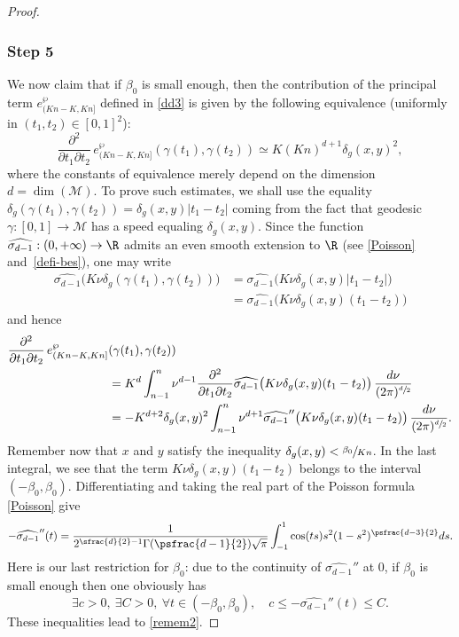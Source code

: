 \begin{proof}
\subsubsection*{Step 5}
We now claim that if $\beta_0$ is small enough, then the contribution of the principal term $e_{(Kn-K,Kn]}^\wp$ defined in \eqref{dd3} is given by the following equivalence (uniformly in $(t_1,t_2)\in [0,1]^2$):\vspace*{-3pt}
\begin{equation}\label{remem2}
\frac{\partial^2}{\partial t_1 \partial t_2}\, e_{(Kn-K,Kn]}^\wp(\gamma(t_1),\gamma(t_2)) \simeq K(Kn)^{d+1} \delta_g(x,y)^2 , \end{equation}
where the constants of equivalence merely depend on the dimension $d=\dim(\mathcal{M})$.
To prove such estimates, we shall use the equality $\delta_g(\gamma(t_1),\gamma(t_2))=\delta_g(x,y)|t_1-t_2|$ coming from the fact that geodesic $\gamma:[0,1]\to \mathcal{M}$ has a speed equaling $\delta_g(x,y)$.
Since the function $\widehat{\sigma_{d-1}}:(0,+\infty)\to \R$ admits an even smooth extension to $\R$ (see \eqref{Poisson} and~\eqref{defi-bes}), one may write
\begin{align*}
\widehat{\sigma_{d-1}}\bigl(K\nu\delta_g(\gamma(t_1),\gamma(t_2))\bigr)&=\widehat{\sigma_{d-1}}\bigl(K\nu \delta_g(x,y) |t_1-t_2|\bigr)\\
&= \widehat{\sigma_{d-1}}\bigl(K\nu \delta_g(x,y) (t_1-t_2)\bigr)
\end{align*}
and hence
\begin{align*}
\frac{\partial^2}{\partial t_1 \partial t_2}\, e_{(Kn-K,Kn]}^\wp&(\gamma(t_1),\gamma(t_2)) \\
&= K^d \int_{n-1}^{n} \nu^{d-1} \frac{\partial^2}{\partial t_1 \partial t_2}\widehat{\sigma_{d-1}}\bigl(K\nu \delta_g(x,y) (t_1-t_2)\bigr) \,\frac{d\nu}{(2\pi)^{\sfrac{d}{2}}}\\
&= -K^{d+2} \delta_g(x,y)^2\int_{n-1}^{n} \nu^{d+1} \widehat{\sigma_{d-1}}''\bigl(K\nu \delta_g(x,y) (t_1-t_2)\bigr) \,\frac{d\nu}{(2\pi)^{\sfrac{d}{2}}}.
\end{align*}
Remember now that $x$ and $y$ satisfy the inequality $\delta_g(x,y)<\sfrac{\beta_0}{Kn}$.
In the last integral, we see that the term $K\nu\delta_g(x,y)(t_1-t_2)$ belongs to the interval $(-\beta_0,\beta_0)$.
Differentiating and taking the real part of the Poisson formula \eqref{Poisson} give\vspace*{-3pt}
\begin{equation*}
-\widehat{\sigma_{d-1}}''(t)=\frac{1}{2^{\sfrac{d}{2}-1}\Gamma(\psfrac{d-1}{2})\sqrt{\pi}}\int_{-1}^{1} \cos(ts)s^2 (1-s^2)^{\psfrac{d-3}{2}} ds.
\end{equation*}
Here is our last restriction for $\beta_0$: due to the continuity of $\widehat{\sigma_{d-1}}''$ at $0$, if $\beta_0$ is small enough then one obviously has
\begin{equation*}
\exists c>0,\ \exists C>0,\ \forall t\in (-\beta_0,\beta_0), \quad c\leq -\widehat{\sigma_{d-1}}''(t)\leq C.
\end{equation*}
These inequalities lead to \eqref{remem2}.


\end{proof}
